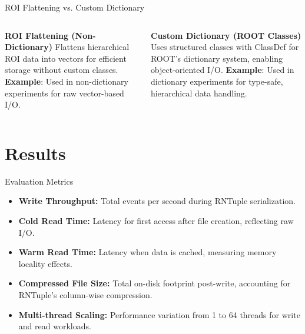 \documentclass[aspectratio=169]{beamer}
\begin{document}
\begin{frame}{ROI Flattening vs. Custom Dictionary}
  \begin{columns}
    \textbf{ROI Flattening (Non-Dictionary)}
    \small Flattens hierarchical ROI data into vectors for efficient storage without custom classes.
    \vspace{0.5em}
    \vspace{0.5em}
    \textbf{Example}: Used in non-dictionary experiments for raw vector-based I/O.

    \textbf{Custom Dictionary (ROOT Classes)}
    \small Uses structured classes with ClassDef for ROOT's dictionary system, enabling object-oriented I/O.
    \vspace{0.5em}
    \vspace{0.5em}
    \textbf{Example}: Used in dictionary experiments for type-safe, hierarchical data handling.
  \end{columns}
  \vspace{1em}
\end{frame}


\section{Results}

\begin{frame}{Evaluation Metrics}
\small
\begin{itemize}
  \item \textbf{Write Throughput:} Total events per second during RNTuple serialization.
  \item \textbf{Cold Read Time:} Latency for first access after file creation, reflecting raw I/O.
  \item \textbf{Warm Read Time:} Latency when data is cached, measuring memory locality effects.
  \item \textbf{Compressed File Size:} Total on-disk footprint post-write, accounting for RNTuple's column-wise compression.
  \item \textbf{Multi-thread Scaling:} Performance variation from 1 to 64 threads for write and read workloads.
\end{itemize}
\end{frame}
\end{document}

